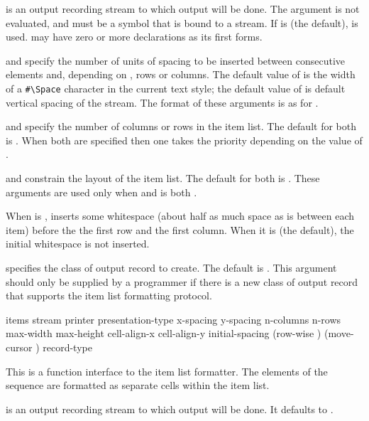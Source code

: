  is an output recording stream to which output will be done.  The
 argument is not evaluated, and must be a symbol that is bound to a
stream.  If  is  (the default),  is
used.   may have zero or more declarations as its first forms.

 and  specify the number of units of spacing to
be inserted between consecutive elements and, depending on ,
rows or columns. The default value of  is the width of a
\verb+#\Space+ character in the current text style; the default value of
 is default vertical spacing of the stream. The format of these
arguments is as for .

 and  specify the number of columns or rows in the
item list. The default for both is . When both are specified then one
takes the priority depending on the value of .

 and  constrain the layout of the item list. The
default for both is . These arguments are used only when 
and  is both .

When  is ,  inserts
some whitespace (about half as much space as is between each item) before the
the first row and the first column. When it is  (the default), the
initial whitespace is not inserted.

 specifies the class of output record to create.  The default
is .  This argument should only be supplied
by a programmer if there is a new class of output record that supports the item
list formatting protocol.


 {items \key stream printer presentation-type
                                  x-spacing y-spacing
                                  n-columns n-rows
                                  max-width max-height
                                  cell-align-x cell-align-y
                                  initial-spacing (row-wise )
                                  (move-cursor ) record-type}

This is a function interface to the item list formatter.  The elements of the
sequence  are formatted as separate cells within the item list.

 is an output recording stream to which output will be done.  It
defaults to .

